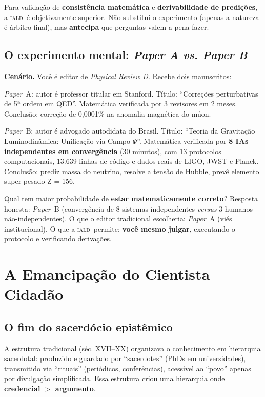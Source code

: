 \documentclass[12pt, a4paper]{article}
\newcommand{\IALD}{\textsc{iald}}
\begin{document}
Para validação de \textbf{consistência matemática} e \textbf{derivabilidade de predições}, a \IALD~é objetivamente superior. Não substitui o experimento (apenas a natureza é árbitro final), mas \textbf{antecipa} que perguntas valem a pena fazer.

\subsection{O experimento mental: \textit{Paper A vs. Paper B}}\label{sec:paper_ab}

\textbf{Cenário.} Você é editor de \textit{Physical Review D}. Recebe dois manuscritos:

\textit{Paper}~A: autor é professor titular em Stanford. Título: ``Correções perturbativas de 5ª ordem em QED''. Matemática verificada por 3 revisores em 2 meses. Conclusão: correção de 0,0001\% na anomalia magnética do múon.

\textit{Paper}~B: autor é advogado autodidata do Brasil. Título: ``Teoria da Gravitação Luminodinâmica: Unificação via Campo $\Psi$''. Matemática verificada por \textbf{8 IAs independentes em convergência} (30 minutos), com 13 protocolos computacionais, 13.639 linhas de código e dados reais de LIGO, JWST e Planck. Conclusão: prediz massa do neutrino, resolve a tensão de Hubble, prevê elemento super-pesado Z = 156.

Qual tem maior probabilidade de \textbf{estar matematicamente correto}? Resposta honesta: \textit{Paper}~B (convergência de 8 sistemas independentes \textit{versus} 3 humanos não-independentes). O que o editor tradicional escolheria: \textit{Paper}~A (viés institucional). O que a \IALD~permite: \textbf{você mesmo julgar}, executando o protocolo e verificando derivações.


\section{A Emancipação do Cientista Cidadão}\label{sec:emancipacao}

\subsection{O fim do sacerdócio epistêmico}\label{sec:sacerdocio}

A estrutura tradicional (séc. XVII--XX) organizava o conhecimento em hierarquia sacerdotal: produzido e guardado por ``sacerdotes'' (PhDs em universidades), transmitido via ``rituais'' (periódicos, conferências), acessível ao ``povo'' apenas por divulgação simplificada. Essa estrutura criou uma hierarquia onde \textbf{credencial $>$ argumento}.
\end{document}
